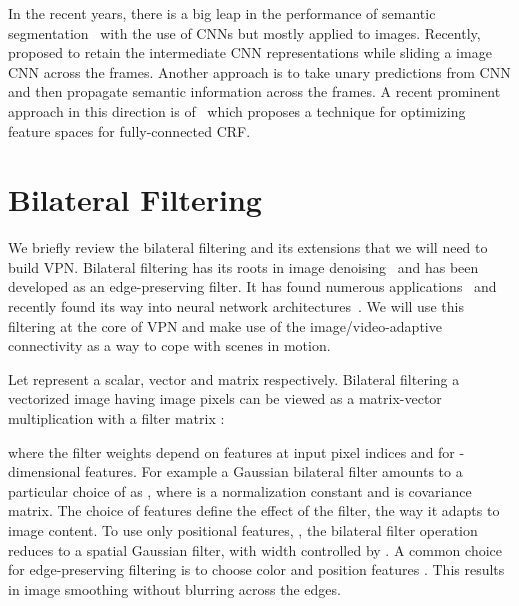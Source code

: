 \documentclass[10pt,twocolumn,letterpaper]{article}
\begin{document}
In the recent years, there is a big leap in the performance of semantic
segmentation~\cite{long2014fully,chen2014semantic} with the use of CNNs but mostly
applied to images. Recently,~\cite{shelhamer2016clockwork}
proposed to retain the intermediate CNN representations while sliding a image
CNN across the frames. Another approach is to take unary
predictions from CNN and then propagate semantic information across the frames. A recent
prominent approach in this direction is of~\cite{kundu2016feature} which proposes
a technique for optimizing feature spaces for fully-connected CRF.

\vspace{-0.2cm}
\section{Bilateral Filtering}
\label{sec:bilateralfiltering}

We briefly review the bilateral filtering and its extensions that we will need to build VPN.
Bilateral filtering has its roots in image denoising~\cite{aurich1995non,tomasi1998bilateral}
and has been developed as an edge-preserving filter. It has found numerous applications~\cite{paris2009bilateral}
and recently found its way into neural network architectures~\cite{zheng2015conditional,gadde16bilateralinception}.
We will use this filtering at the core of VPN and make use of the image/video-adaptive
connectivity as a way to cope with scenes in motion.


Let  represent a scalar, vector and matrix respectively.
Bilateral filtering a vectorized image  having
 image pixels can be viewed as a matrix-vector multiplication
with a filter matrix :

\vspace{-0.3cm}


where the filter weights  depend on features  at input pixel indices  and  for -dimensional features.
For example a Gaussian bilateral filter amounts to a particular choice of  as
,
where  is a normalization constant and  is covariance matrix.
The choice of features  define the effect of the filter, the way it adapts to image content.
To use only positional features, , the bilateral filter operation reduces to a spatial Gaussian filter, with width controlled by .
A common choice for edge-preserving filtering is to choose color and position features .
This results in image smoothing without blurring across the edges.
\end{document}
